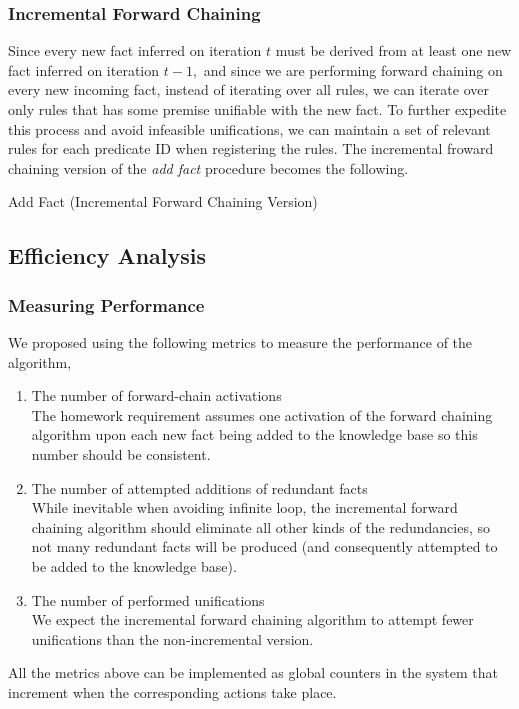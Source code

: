 \documentclass[letterpaper]{article}
\begin{document}
\subsubsection{Incremental Forward Chaining}
Since every new fact inferred on iteration $t$ must be derived from at least one new fact inferred on iteration $t-1,$ and since we are performing forward chaining on every new incoming fact, instead of iterating over all rules, we can iterate over only rules that has some premise unifiable with the new fact. To further expedite this process and avoid infeasible unifications, we can maintain a set of relevant rules for each predicate ID when registering the rules. The incremental froward chaining version of the \textit{add fact} procedure becomes the following.
\begin{algorithm}[H]
	\LinesNumbered
	\caption{Add Fact (Incremental Forward Chaining Version)}
\end{algorithm}
\subsection{Efficiency Analysis}
\subsubsection{Measuring Performance}
We proposed using the following metrics to measure the performance of the algorithm,
\begin{enumerate}
	\item The number of forward-chain activations\\
	The homework requirement assumes one activation of the forward chaining algorithm upon each new fact being added to the knowledge base so this number should be consistent.
	\item The number of attempted additions of redundant facts\\
	While inevitable when avoiding infinite loop, the incremental forward chaining algorithm should eliminate all other kinds of the redundancies, so not many redundant facts will be produced (and consequently attempted to be added to the knowledge base).
	\item The number of performed unifications\\
	We expect the incremental forward chaining algorithm to attempt fewer unifications than the non-incremental version.
\end{enumerate}
All the metrics above can be implemented as global counters in the system that increment when the corresponding actions take place.
\end{document}
